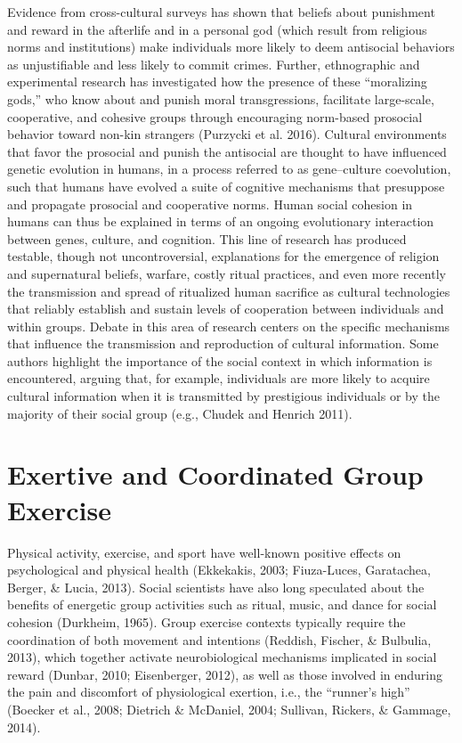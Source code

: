 Evidence from cross-cultural surveys has shown that beliefs about punishment and reward in the afterlife and in a personal god (which result from religious norms and institutions) make individuals more likely to deem antisocial behaviors as unjustifiable and less likely to commit crimes. Further, ethnographic and experimental research has investigated how the presence of these “moralizing gods,” who know about and punish moral transgressions, facilitate large-scale, cooperative, and cohesive groups through encouraging norm-based prosocial behavior toward non-kin strangers (Purzycki et al. 2016). Cultural environments that favor the prosocial and punish the antisocial are thought to have influenced genetic evolution in humans, in a process referred to as gene–culture coevolution, such that humans have evolved a suite of cognitive mechanisms that presuppose and propagate prosocial and cooperative norms.
Human social cohesion in humans can thus be explained in terms of an ongoing evolutionary interaction between genes, culture, and cognition. This line of research has produced testable, though not uncontroversial, explanations for the emergence of religion and supernatural beliefs, warfare, costly ritual practices, and even more recently the transmission and spread of ritualized human sacrifice as cultural technologies that reliably establish and sustain levels of cooperation between individuals and within groups. Debate in this area of research centers on the specific mechanisms that influence the transmission and reproduction of cultural information. Some authors highlight the importance of the social context in which information is encountered, arguing that, for example, individuals are more likely to acquire cultural information when it is transmitted by prestigious individuals or by the majority of their social group (e.g., Chudek and Henrich 2011).













\section{Exertive and Coordinated Group Exercise}
Physical activity, exercise, and sport have well-known positive effects on psychological and physical health (Ekkekakis, 2003; Fiuza-Luces, Garatachea, Berger, \& Lucia, 2013).
Social scientists have also long speculated about the benefits of energetic group activities such as ritual, music, and dance for social cohesion (Durkheim, 1965).  Group exercise contexts typically require the coordination of both movement and intentions (Reddish, Fischer, \& Bulbulia, 2013), which together activate neurobiological mechanisms implicated in social reward (Dunbar, 2010; Eisenberger, 2012), as well as those involved in enduring the pain and discomfort of physiological exertion, i.e., the ``runner’s high'' (Boecker et al., 2008; Dietrich \& McDaniel, 2004; Sullivan, Rickers, \& Gammage, 2014).


